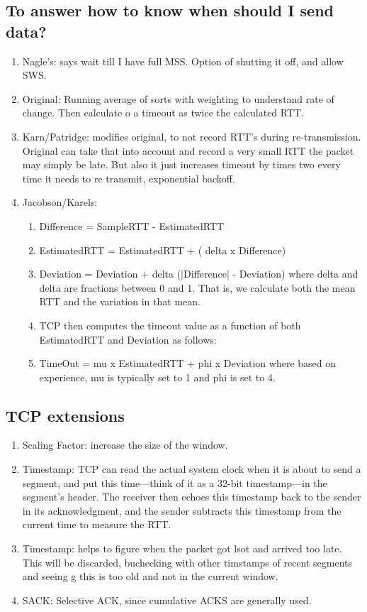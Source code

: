 \documentclass[12pt]{book}
\begin{document}
\subsection{To answer how to know when should I send data?}
\begin{enumerate}
    \item Nagle's: says wait till I have full MSS. Option of shutting it off, and allow SWS.
    \item Original: Running average of sorts with weighting to understand rate of change. Then calculate o a timeout as twice the calculated RTT.
    \item Karn/Patridge: modifies original, to not record RTT's during re-transmission. Original can take that into account and record a very small RTT the packet may simply be late. But also it just increases timeout by times two every time it needs to re transmit, exponential backoff.
    \item Jacobson/Karels:
    \begin{enumerate}
        \item Difference = SampleRTT - EstimatedRTT
        \item EstimatedRTT = EstimatedRTT + ( delta x Difference)
        \item Deviation = Deviation + delta (|Difference| - Deviation) where delta and delta are fractions between 0 and 1. That is, we calculate both the mean RTT and the variation in that mean.
        \item TCP then computes the timeout value as a function of both EstimatedRTT and Deviation as follows:
        \item TimeOut = mu x EstimatedRTT + phi x Deviation where based on experience, mu is typically set to 1 and phi is set to 4.
    \end{enumerate}
\end{enumerate}
\subsection{TCP extensions}
\begin{enumerate}
    \item Scaling Factor: increase the size of the window.
    \item Timestamp: TCP can read the actual system clock when it is about to send a segment, and put this time—think of it as a 32-bit timestamp—in the segment’s header. The receiver then echoes this timestamp back to the sender in its acknowledgment, and the sender subtracts this timestamp from the current time to measure the RTT.
    \item Timestamp: helps to figure when the packet got lsot and arrived too late. This will be discarded, buchecking with other timstamps of recent segments and seeing g this is too old and not in the current window.
    \item SACK: Selective ACK, since cumulative ACKS are generally used.
\end{enumerate}
\end{document}

